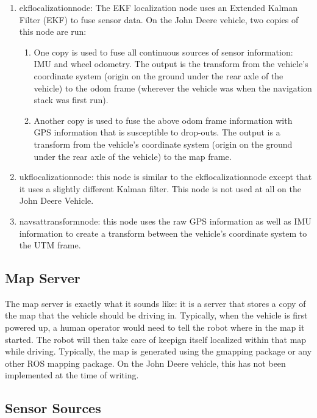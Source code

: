 \begin{enumerate}
\item ekf\textunderscore localization\textunderscore node: The EKF localization node uses an Extended Kalman Filter (EKF) to fuse sensor data. On the John Deere vehicle, two copies of this node are run: 
\begin{enumerate}
\item One copy is used to fuse all continuous sources of sensor information: IMU and wheel odometry. The output is the transform from the vehicle's coordinate system (origin on the ground under the rear axle of the vehicle) to the odom frame (wherever the vehicle was when the navigation stack was first run). 
\item Another copy is used to fuse the above odom frame information with GPS information that is susceptible to drop-outs. The output is a transform from the vehicle's coordinate system (origin on the ground under the rear axle of the vehicle) to the map frame.
\end{enumerate}
\item ukf\textunderscore localization\textunderscore node: this node is similar to the ekf\textunderscore localization\textunderscore node except that it uses a slightly different Kalman filter. This node is not used at all on the John Deere Vehicle.
\item navsat\textunderscore transform\textunderscore node: this node uses the raw GPS information as well as IMU information to create a transform between the vehicle's coordinate system to the UTM frame. 
\end{enumerate}

\subsection{Map Server}

The map server is exactly what it sounds like: it is a server that stores a copy of the map that the vehicle should be driving in. Typically, when the vehicle is first powered up, a human operator would need to tell the robot where in the map it started. The robot will then take care of keepign itself localized within that map while driving. Typically, the map is generated using the gmapping package or any other ROS mapping package. On the John Deere vehicle, this has not been implemented at the time of writing.

\subsection{Sensor Sources}

